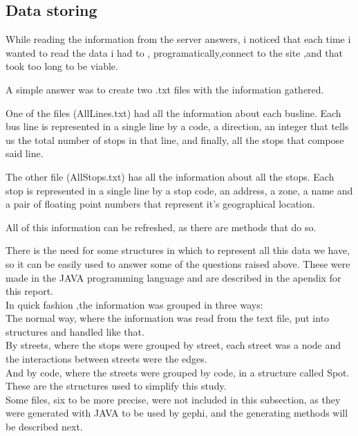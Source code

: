 \documentclass[12pt]{article}
\begin{document}
\subsection{Data storing}

While reading the information from the server answers, i noticed that each time i wanted to read the data i had to , programatically,connect to the site ,and that took too long to be viable. 

A simple answer was to create two .txt files with the information gathered.

One of the files (AllLines.txt) had all the information about each busline.
Each bus line is represented in a single line by a code, a direction, an integer that tells us the total number of stops in that line, and finally, all the stops that compose said line.

The other file (AllStops.txt) has all the information about all the stops.
Each stop is represented in a single line by a stop code, an address, a zone, a name and a pair of floating point numbers that represent it's geographical location. 

All of this information can be refreshed, as there are methods that do so.

There is the need for some structures in which to represent all this data we have, so it can be easily used to answer some of the questions raised above. These were made in the JAVA programming language and are described in the apendix for this report.\\

	In quick fashion ,the information was grouped in three ways:\\
	
	The normal way, where the information was read from the text file, put into structures and handled like that.\\
	
	 By streets, where the stops were grouped by street, each street was a node and the interactions between streets were the edges.\\
	 
	 And by code, where the streets were grouped by code, in a structure called Spot.\\
	
	

	These are the structures used to simplify this study.\\
	Some files, six to be more precise, were not included in this subsection, as they were generated with JAVA to be used by gephi, and the generating methods will be described next.
\end{document}

